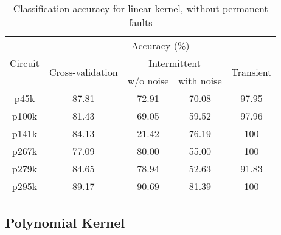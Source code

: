 \begin{table}[h]

	\captionsetup{justification=centering}
\begin{tabular}{ccccc}
\hline
\multirow{3}{*}{Circuit} & \multicolumn{4}{c}{Accuracy (\%)}\\ \cline{2-5} 
                         & \multirow{2}{*}{Cross-validation} & \multicolumn{2}{c}{Intermittent} & \multirow{2}{*}{Transient} \\ \cline{3-4}
                         &                                   & w/o noise      & with noise      &                            \\ \hline
p45k                     & 87.81                             & 72.91          & 70.08           & 97.95                      \\
p100k                    & 81.43                             & 69.05          & 59.52           & 97.96                      \\
p141k                    & 84.13                             & 21.42          & 76.19           & 100                        \\
p267k                    & 77.09                             & 80.00          & 55.00           & 100                        \\
p279k                    & 84.65                             & 78.94          & 52.63           & 91.83                      \\
p295k                    & 89.17                             & 90.69          & 81.39           & 100           \\
\hline            
\end{tabular}
\caption {Classification accuracy for linear kernel, without permanent faults}
\label{tab:linwop}
\end{table}


\subsection{Polynomial Kernel}


